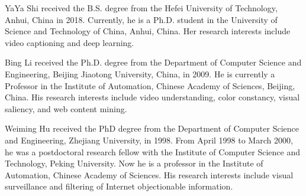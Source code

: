 \documentclass[journal]{IEEEtran}
\begin{document}
\begin{IEEEbiographynophoto}
{YaYa Shi}
received the B.S. degree from the Hefei University of Technology, Anhui, China in 2018. Currently, he is a Ph.D. student in the University of Science and Technology of China, Anhui, China. Her research interests include video captioning and deep learning.
\end{IEEEbiographynophoto}

\begin{IEEEbiographynophoto}
{Bing Li}
received the Ph.D. degree from the Department of Computer Science and Engineering, Beijing Jiaotong University, China, in 2009. He is currently a Professor in the Institute of Automation, Chinese Academy of Sciences, Beijing, China. His research interests include video understanding, color constancy, visual saliency, and web content mining.
\end{IEEEbiographynophoto}

\begin{IEEEbiographynophoto}
{Weiming Hu}
received the PhD degree from the Department of Computer Science and Engineering, Zhejiang University, in 1998. From April 1998 to March 2000, he was a postdoctoral research fellow with the Institute of Computer Science and Technology, Peking University. Now he is a professor in the Institute of Automation, Chinese Academy of Sciences. His research interests include visual surveillance and filtering of Internet objectionable information.
\end{IEEEbiographynophoto}
\end{document}
